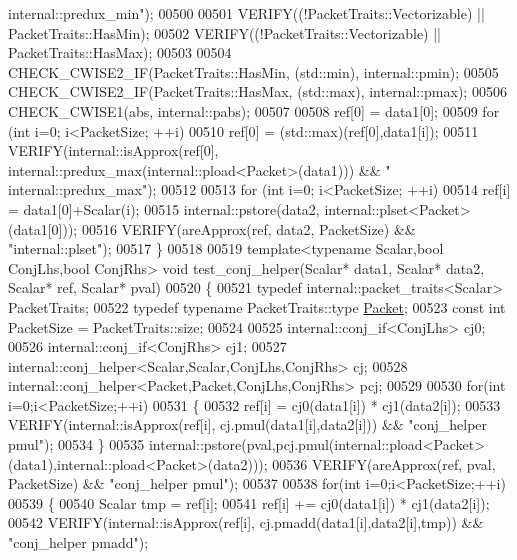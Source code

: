 \begin{DoxyCode}
{      internal::predux\_min"});
00500 
00501   VERIFY((!PacketTraits::Vectorizable) || PacketTraits::HasMin);
00502   VERIFY((!PacketTraits::Vectorizable) || PacketTraits::HasMax);
00503 
00504   CHECK\_CWISE2\_IF(PacketTraits::HasMin, (std::min), internal::pmin);
00505   CHECK\_CWISE2\_IF(PacketTraits::HasMax, (std::max), internal::pmax);
00506   CHECK\_CWISE1(abs, internal::pabs);
00507 
00508   ref[0] = data1[0];
00509   \textcolor{keywordflow}{for} (\textcolor{keywordtype}{int} i=0; i<PacketSize; ++i)
00510     ref[0] = (std::max)(ref[0],data1[i]);
00511   VERIFY(internal::isApprox(ref[0], internal::predux\_max(internal::pload<Packet>(data1))) && \textcolor{stringliteral}{"
      internal::predux\_max"});
00512 
00513   \textcolor{keywordflow}{for} (\textcolor{keywordtype}{int} i=0; i<PacketSize; ++i)
00514     ref[i] = data1[0]+Scalar(i);
00515   internal::pstore(data2, internal::plset<Packet>(data1[0]));
00516   VERIFY(areApprox(ref, data2, PacketSize) && \textcolor{stringliteral}{"internal::plset"});
00517 \}
00518 
00519 \textcolor{keyword}{template}<\textcolor{keyword}{typename} Scalar,\textcolor{keywordtype}{bool} ConjLhs,\textcolor{keywordtype}{bool} ConjRhs> \textcolor{keywordtype}{void} test\_conj\_helper(Scalar* data1, Scalar* data2, 
      Scalar* ref, Scalar* pval)
00520 \{
00521   \textcolor{keyword}{typedef} internal::packet\_traits<Scalar> PacketTraits;
00522   \textcolor{keyword}{typedef} \textcolor{keyword}{typename} PacketTraits::type \hyperlink{group___sparse_core___module}{Packet};
00523   \textcolor{keyword}{const} \textcolor{keywordtype}{int} PacketSize = PacketTraits::size;
00524 
00525   internal::conj\_if<ConjLhs> cj0;
00526   internal::conj\_if<ConjRhs> cj1;
00527   internal::conj\_helper<Scalar,Scalar,ConjLhs,ConjRhs> cj;
00528   internal::conj\_helper<Packet,Packet,ConjLhs,ConjRhs> pcj;
00529 
00530   \textcolor{keywordflow}{for}(\textcolor{keywordtype}{int} i=0;i<PacketSize;++i)
00531   \{
00532     ref[i] = cj0(data1[i]) * cj1(data2[i]);
00533     VERIFY(internal::isApprox(ref[i], cj.pmul(data1[i],data2[i])) && \textcolor{stringliteral}{"conj\_helper pmul"});
00534   \}
00535   internal::pstore(pval,pcj.pmul(internal::pload<Packet>(data1),internal::pload<Packet>(data2)));
00536   VERIFY(areApprox(ref, pval, PacketSize) && \textcolor{stringliteral}{"conj\_helper pmul"});
00537 
00538   \textcolor{keywordflow}{for}(\textcolor{keywordtype}{int} i=0;i<PacketSize;++i)
00539   \{
00540     Scalar tmp = ref[i];
00541     ref[i] += cj0(data1[i]) * cj1(data2[i]);
00542     VERIFY(internal::isApprox(ref[i], cj.pmadd(data1[i],data2[i],tmp)) && \textcolor{stringliteral}{"conj\_helper pmadd"});

\end{DoxyCode}
